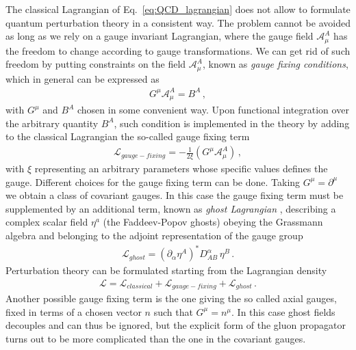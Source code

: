 %
The classical Lagrangian of Eq.~\eqref{eq:QCD_lagrangian} does not allow to formulate quantum
perturbation theory in a consistent way. The problem cannot be avoided as long as
we rely on a gauge invariant Lagrangian, where the gauge field $\mathcal{A}^A_{\mu}$
has the freedom to change according to gauge transformations.
We can get rid of such freedom by putting constraints on the field $\mathcal{A}^A_{\mu}$, 
known as \textit{gauge fixing conditions}, which in general can be expressed as
\begin{align}
    \label{eq:gauge_fixing}
    G^{\mu}\mathcal{A}_{\mu}^A = B^A\,,
\end{align}
with $G^{\mu}$ and $B^A$ chosen in some convenient way. 
Upon functional integration over the arbitrary quantity $B^A$, such condition is implemented 
in the theory by adding to the classical Lagrangian the so-called gauge fixing term
\begin{align}
    \label{eq:Gauge_fixing_lorents}
    \mathcal{L}_{gauge-fixing} = -\frac{1}{2\xi}\left(G^{\mu}\mathcal{A}_{\mu}^A\right)\,,
\end{align}
with $\xi$ representing an arbitrary parameters whose specific values defines the gauge.
Different choices for the gauge fixing term can be done. Taking $G^{\mu}=\partial^{\mu}$ we obtain
a class of covariant gauges. In this case the gauge fixing term must be supplemented by an additional term,
known as \textit{ghost Lagrangian} \cite{Faddeev:1967fc},
describing a complex scalar field $\eta^a$ (the Faddeev-Popov ghosts) obeying the Grassmann algebra and belonging to the adjoint
representation of the gauge group
\begin{align}
    \label{eq:ghosts_lagrangian}
    \mathcal{L}_{ghost} = \left(\partial_{\alpha}\eta^A\right)^* D^{\alpha}_{AB}\, \eta^B\, .
\end{align}
Perturbation theory can be formulated starting from the Lagrangian density
\begin{align}
    \label{eq:QCD_lagrangian_gauge_fixing}
    \mathcal{L} = \mathcal{L}_{classical} + \mathcal{L}_{gauge-fixing} + \mathcal{L}_{ghost}\, .
\end{align}
Another possible gauge fixing term is the one giving the so called axial gauges, fixed
in terms of a chosen vector $n$ such that $G^{\mu}=n^{\mu}$. In this case ghost fields decouples
and can thus be ignored, but the explicit form of the gluon propagator turns out to be more complicated than 
the one in the covariant gauges.

